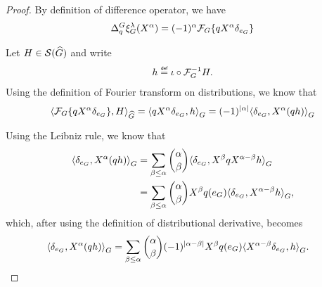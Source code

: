 \begin{proof}
    By definition of difference operator,
    we have
    \begin{align*}
        \DifferenceOperator q \Rep \lambda(\LeftDifferentialOperator \alpha)
        = (-1)^\alpha \Fourier \{q \LeftDifferentialOperator \alpha \delta_{e_\Group}\}
    \end{align*}

    Let $H \in {\mathcal{S} ({\widehat{G}})}$ and write
    \begin{align*}
        h \defeq \iota \circ \InverseFourier H.
    \end{align*}
    Using the definition of Fourier transform on distributions,
    we know that
    \begin{align}
        \dualBracket [\dualGroup \Group] {%
            \Fourier \{ q \LeftDifferentialOperator \alpha \delta_{e_\Group} \}
        } H
        =
        \dualBracket [\Group] {%
            q \LeftDifferentialOperator \alpha \delta_{e_\Group}
        } h
        =
        (-1)^{\abs \alpha}
        \dualBracket [\Group] {\delta_{e_\Group}} {\LeftDifferentialOperator \alpha (qh)}
        \label{eq:difference_operator_of_X_alpha}
    \end{align}

    Using the Leibniz rule,
    we know that
    \begin{align*}
        \dualBracket [\Group] {\delta_{e_\Group}} {\LeftDifferentialOperator \alpha (qh)}
        &=
        \sum_{\beta \leq \alpha} \binom \alpha \beta
        \dualBracket [\Group] {\delta_{e_\Group}} {\LeftDifferentialOperator \beta q \LeftDifferentialOperator {\alpha - \beta} h}\\
        &=
        \sum_{\beta \leq \alpha} \binom \alpha \beta
        \LeftDifferentialOperator \beta q(e_\Group)
        \dualBracket [\Group] {\delta_{e_\Group}} {\LeftDifferentialOperator {\alpha - \beta} h},
    \end{align*}
    which, after using the definition of distributional derivative,
    becomes
    \begin{align*}
        \dualBracket [\Group] {\delta_{e_\Group}} {\LeftDifferentialOperator \alpha (qh)}
        &=
        \sum_{\beta \leq \alpha} \binom \alpha \beta
        (-1)^{\abs {\alpha - \beta}}
        \LeftDifferentialOperator \beta q(e_\Group)
        \dualBracket [\Group] {\LeftDifferentialOperator {\alpha - \beta} \delta_{e_\Group}} {h}.
    \end{align*}


\end{proof}
